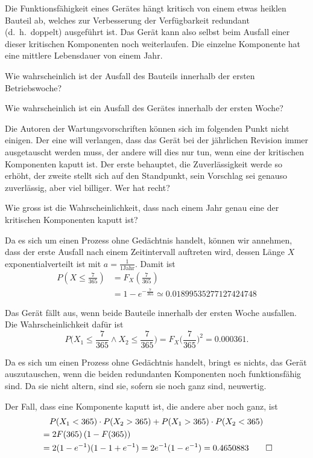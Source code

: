 Die Funktionsfähigkeit eines Gerätes hängt kritisch von einem etwas
heiklen Bauteil ab, welches zur Verbesserung der Verfügbarkeit redundant
(d.~h.~doppelt)
ausgeführt ist. Das Gerät kann also selbst beim Ausfall einer dieser
kritischen
Komponenten noch weiterlaufen. Die einzelne Komponente hat eine mittlere
Lebensdauer von einem Jahr.
\begin{teilaufgaben}
\item Wie wahrscheinlich ist der Ausfall des Bauteils innerhalb der
ersten Betriebswoche?
\item Wie wahrscheinlich ist ein Ausfall des Gerätes innerhalb der
ersten Woche?
\item Die Autoren der Wartungsvorschriften können sich im folgenden Punkt
nicht einigen. Der eine will verlangen, dass das Gerät bei der jährlichen
Revision immer ausgetauscht werden muss, der andere will dies nur tun, wenn
eine der kritischen Komponenten kaputt ist.
Der erste behauptet, die Zuverlässigkeit werde so erhöht, der zweite
stellt sich auf den Standpunkt, sein Vorschlag sei genauso zuverlässig,
aber viel billiger. Wer hat recht?
\item
Wie gross ist die Wahrscheinlichkeit, dass nach einem Jahr genau
eine der kritischen Komponenten kaputt ist?
\end{teilaufgaben}


\begin{loesung}
\begin{teilaufgaben}
\item Da es sich um einen Prozess ohne Gedächtnis handelt, können wir
annehmen, dass der erste Ausfall nach einem Zeitintervall auftreten
wird, dessen Länge $X$ exponentialverteilt ist mit $a=\frac1{1\text{Jahr}}$.
Damit ist
\begin{align*}
P\left(X\le \frac{7}{365}\right)
&=
F_X\left(\frac{7}{365}\right)\\
&=
1-e^{-\frac{7}{365}}
\simeq
0.01899535277127424748
\end{align*}
\item
Das Gerät fällt aus, wenn beide Bauteile innerhalb der ersten
Woche ausfallen. Die Wahrscheinlichkeit dafür ist
\[
P\biggl(X_1\le \frac{7}{365}\wedge X_2\le \frac{7}{365}\biggr)
=F_X\biggl(\frac{7}{365}\biggr)^2=0.000361.
\]
\item
Da es sich um einen Prozess ohne Gedächtnis handelt, bringt es
nichts, das Gerät auszutauschen, wenn die beiden redundanten Komponenten
noch funktionsfähig sind. Da sie nicht altern, sind sie, sofern sie
noch ganz sind, neuwertig.
\item
Der Fall, dass eine Komponente kaputt ist, die andere aber noch ganz,
ist
\begin{align*}
&\quad P(X_1 < 365)\cdot P(X_2>365)
+P(X_1 > 365)\cdot P(X_2<365)
\\
&=
2F(365)\,(1-F(365))
\\
&=
2(1-e^{-1})(1-1+e^{-1})=2e^{-1}(1-e^{-1})=0.4650883
\qedhere
\end{align*}
\end{teilaufgaben}
\end{loesung}

